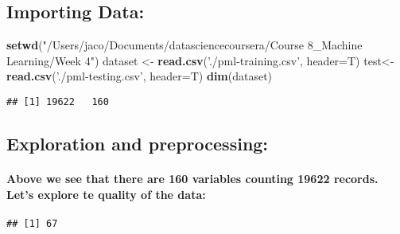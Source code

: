 \documentclass[]{article}
\newenvironment{Shaded}{\begin{snugshade}}{\end{snugshade}}
\newcommand{\KeywordTok}[1]{\textcolor[rgb]{0.13,0.29,0.53}{\textbf{#1}}}
\newcommand{\DataTypeTok}[1]{\textcolor[rgb]{0.13,0.29,0.53}{#1}}
\newcommand{\DecValTok}[1]{\textcolor[rgb]{0.00,0.00,0.81}{#1}}
\newcommand{\StringTok}[1]{\textcolor[rgb]{0.31,0.60,0.02}{#1}}
\newcommand{\ControlFlowTok}[1]{\textcolor[rgb]{0.13,0.29,0.53}{\textbf{#1}}}
\newcommand{\OperatorTok}[1]{\textcolor[rgb]{0.81,0.36,0.00}{\textbf{#1}}}
\newcommand{\NormalTok}[1]{#1}
\let\oldparagraph\paragraph
\renewcommand{\paragraph}[1]{\oldparagraph{#1}\mbox{}}
\begin{document}
\subsection{Importing Data:}\label{importing-data}

\begin{Shaded}
\begin{Highlighting}[]
\KeywordTok{setwd}\NormalTok{(}\StringTok{"/Users/jaco/Documents/datasciencecoursera/Course 8_Machine Learning/Week 4"}\NormalTok{)}
\NormalTok{dataset <-}\StringTok{ }\KeywordTok{read.csv}\NormalTok{(}\StringTok{'./pml-training.csv'}\NormalTok{, }\DataTypeTok{header=}\NormalTok{T)}
\NormalTok{test<-}\StringTok{ }\KeywordTok{read.csv}\NormalTok{(}\StringTok{'./pml-testing.csv'}\NormalTok{, }\DataTypeTok{header=}\NormalTok{T)}
\KeywordTok{dim}\NormalTok{(dataset)}
\end{Highlighting}
\end{Shaded}

\begin{verbatim}
## [1] 19622   160
\end{verbatim}

\subsection{Exploration and
preprocessing:}\label{exploration-and-preprocessing}

\paragraph{Above we see that there are 160 variables counting 19622
records. Let's explore te quality of the
data:}\label{above-we-see-that-there-are-160-variables-counting-19622-records.-lets-explore-te-quality-of-the-data}

\begin{Shaded}
\end{Shaded}

\begin{verbatim}
## [1] 67
\end{verbatim}
\end{document}
